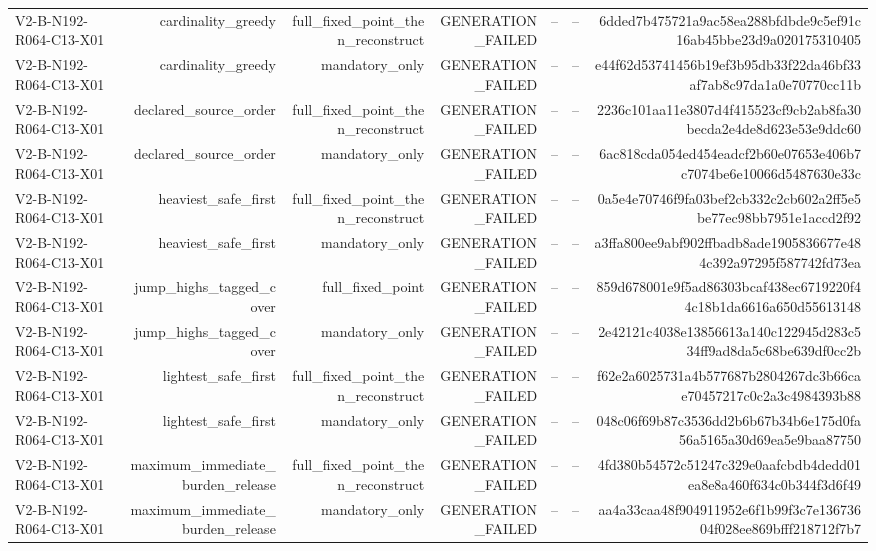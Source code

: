{\begin{longtable}{lrrrrrr}
V2-B-N192-R064-C13-X01 & cardinality\_greedy & full\_fixed\_point\_then\_reconstruct & GENERATION\_FAILED & -- & -- & 6dded7b475721a9ac58ea288bfdbde9c5ef91c16ab45bbe23d9a020175310405 \\
V2-B-N192-R064-C13-X01 & cardinality\_greedy & mandatory\_only & GENERATION\_FAILED & -- & -- & e44f62d53741456b19ef3b95db33f22da46bf33af7ab8c97da1a0e70770cc11b \\
V2-B-N192-R064-C13-X01 & declared\_source\_order & full\_fixed\_point\_then\_reconstruct & GENERATION\_FAILED & -- & -- & 2236c101aa11e3807d4f415523cf9cb2ab8fa30becda2e4de8d623e53e9ddc60 \\
V2-B-N192-R064-C13-X01 & declared\_source\_order & mandatory\_only & GENERATION\_FAILED & -- & -- & 6ac818cda054ed454eadcf2b60e07653e406b7c7074be6e10066d5487630e33c \\
V2-B-N192-R064-C13-X01 & heaviest\_safe\_first & full\_fixed\_point\_then\_reconstruct & GENERATION\_FAILED & -- & -- & 0a5e4e70746f9fa03bef2cb332c2cb602a2ff5e5be77ec98bb7951e1accd2f92 \\
V2-B-N192-R064-C13-X01 & heaviest\_safe\_first & mandatory\_only & GENERATION\_FAILED & -- & -- & a3ffa800ee9abf902ffbadb8ade1905836677e484c392a97295f587742fd73ea \\
V2-B-N192-R064-C13-X01 & jump\_highs\_tagged\_cover & full\_fixed\_point & GENERATION\_FAILED & -- & -- & 859d678001e9f5ad86303bcaf438ec6719220f44c18b1da6616a650d55613148 \\
V2-B-N192-R064-C13-X01 & jump\_highs\_tagged\_cover & mandatory\_only & GENERATION\_FAILED & -- & -- & 2e42121c4038e13856613a140c122945d283c534ff9ad8da5c68be639df0cc2b \\
V2-B-N192-R064-C13-X01 & lightest\_safe\_first & full\_fixed\_point\_then\_reconstruct & GENERATION\_FAILED & -- & -- & f62e2a6025731a4b577687b2804267dc3b66cae70457217c0c2a3c4984393b88 \\
V2-B-N192-R064-C13-X01 & lightest\_safe\_first & mandatory\_only & GENERATION\_FAILED & -- & -- & 048c06f69b87c3536dd2b6b67b34b6e175d0fa56a5165a30d69ea5e9baa87750 \\
V2-B-N192-R064-C13-X01 & maximum\_immediate\_burden\_release & full\_fixed\_point\_then\_reconstruct & GENERATION\_FAILED & -- & -- & 4fd380b54572c51247c329e0aafcbdb4dedd01ea8e8a460f634c0b344f3d6f49 \\
V2-B-N192-R064-C13-X01 & maximum\_immediate\_burden\_release & mandatory\_only & GENERATION\_FAILED & -- & -- & aa4a33caa48f904911952e6f1b99f3c7e13673604f028ee869bfff218712f7b7 \\

\end{longtable}}
